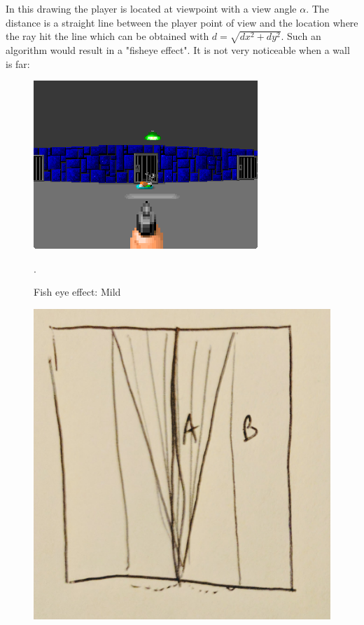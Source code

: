 In this drawing the player is located at viewpoint with a view angle \begin{math}\alpha\end{math}. The distance  is a straight line between the player point of view and the location where the ray hit the line which can be obtained with $d = \sqrt{dx^2 + dy^2}$. Such an algorithm would result in a "fisheye effect". It is not very noticeable when a wall is far:

\begin{figure}[H]
\centering
 \includegraphics[width=\textwidth]{imgs/fish_eye/bad_mild.png}
 \caption{Fish eye effect: Mild}. \label{fig:mips}
 \end{figure}

\begin{figure}[H]
  \centering
 \includegraphics[width=.3\textwidth]{imgs/fish_eye/fish_eye_top_far.png}
\end{figure}
\par


